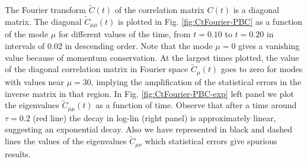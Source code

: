 \documentclass[a4paper,openright,12pt]{book}
\begin{document}
The Fourier transform $\tilde{C}(t)$  of the correlation matrix $C(t)$
is a diagonal matrix.  The diagonal $\tilde{C}_{\mu\mu}(t)$ is plotted
in Fig.   \ref{fig:CtFourier-PBC} as a function of the mode
$\mu$      for      different       values      of      the      time,
from $t=0.10$ to $t=0.20$ in intervals of $0.02$ in  descending   order.   Note that the  mode
$\mu=0$ gives a vanishing value  because of momentum conservation. At the largest times plotted,
the  value  of  the  diagonal  correlation  matrix  in  Fourier  space
$\tilde{C}_\mu(t)$ goes to  zero for modes with  values near $\mu=30$,
implying the  amplification of the  statistical errors in  the inverse
matrix in that  region.  In Fig.  \ref{fig:CtFourier-PBC-exp}  left panel we
plot the  eigenvalues $\tilde{C}_{\mu\mu}(t)$  as a function  of time.
Observe  that after  a time  around  $\tau=0.2$ (red line) the  decay in  log-lin
(right  panel) is  approximately  linear,  suggesting an  exponential
decay. Also we have represented in black and dashed lines the values of the eigenvalues $\tilde{C}_{\mu\nu}$ which statistical errors give spurious results. 
\end{document}
